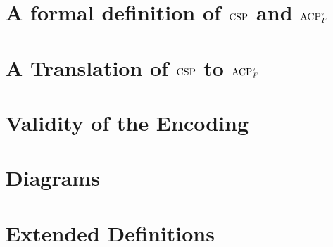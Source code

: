 \documentclass[logo,bsc,singlespacing,parskip,online]{infthesis}
\begin{document}
\chapter{A formal definition of \texorpdfstring{$\mathrm{CSP}$}{CSP} and \texorpdfstring{$\mathrm{ACP}_{F}^{\tau}$}{ACP}}


\chapter{A Translation of \texorpdfstring{$\mathrm{CSP}$}{CSP} to \texorpdfstring{$\mathrm{ACP}_{F}^{\tau}$}{ACP}}



\newpage
\chapter{Validity of the Encoding}


% 





\appendix

\chapter{Diagrams}


\chapter{Extended Definitions}

\end{document}
